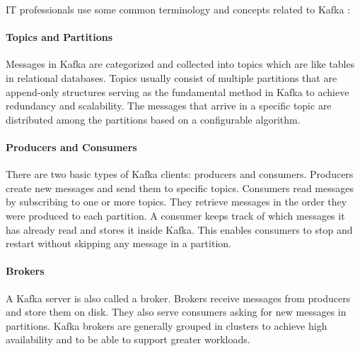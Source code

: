 IT professionals use some common terminology and concepts related to Kafka \cite{KafkaDefinitive}:

\paragraph{Topics and Partitions} Messages in Kafka are categorized and collected into topics which are like tables in relational databases. Topics usually consist of multiple partitions that are append-only structures serving as the fundamental method in Kafka to achieve redundancy and scalability. The messages that arrive in a specific topic are distributed among the partitions based on a configurable algorithm. 

\paragraph{Producers and Consumers} There are two basic types of Kafka clients: producers and consumers. Producers create new messages and send them to specific topics. Consumers read messages by subscribing to one or more topics. They retrieve messages in the order they were produced to each partition. A consumer keeps track of which messages it has already read and stores it inside Kafka. This enables consumers to stop and restart without skipping any message in a partition.

\paragraph{Brokers} A Kafka server is also called a broker. Brokers receive messages from producers and store them on disk. They also serve consumers asking for new messages in partitions. Kafka brokers are generally grouped in clusters to achieve high availability and to be able to support greater workloads.

